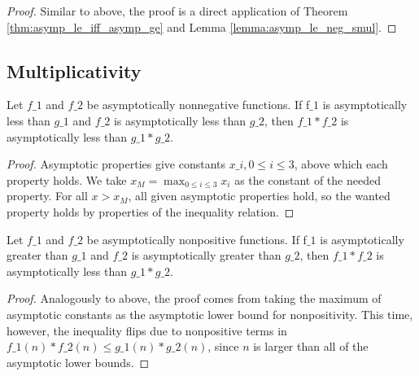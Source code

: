 \begin{proof}
    \leanok
    Similar to above, the proof is a direct application of Theorem \ref{thm:asymp_le_iff_asymp_ge}
    and Lemma \ref{lemma:asymp_le_neg_smul}.
\end{proof}


\subsection{Multiplicativity}

\begin{theorem}
    \label{thm:asymp_le_nonneg_mul}
    \leanok
    Let $f\_1$ and $f\_2$ be asymptotically nonnegative functions. If f$\_1$ is asymptotically
    less than $g\_1$ and $f\_2$ is asymptotically less than $g\_2$, then $f\_1 * f\_2$
    is asymptotically less than $g\_1 * g\_2$.
\end{theorem}

\begin{proof}
    \leanok
    Asymptotic properties give constants $x\_i, 0 \le i \le 3$, above which each property holds.
    We take $x_M = \max_{0 \le i \le 3} x_i$ as the constant of the needed property. 
    For all $x > x_M$, all given asymptotic properties hold, so the wanted property holds
    by properties of the inequality relation.
\end{proof}

\begin{theorem}
    \label{thm:asymp_ge_nonpos_mul}
    \leanok
    Let $f\_1$ and $f\_2$ be asymptotically nonpositive functions. If f$\_1$ is asymptotically
    greater than $g\_1$ and $f\_2$ is asymptotically greater than $g\_2$, then $f\_1 * f\_2$
    is asymptotically less than $g\_1 * g\_2$.
\end{theorem}

\begin{proof}
    \leanok
    Analogously to above, the proof comes from taking the maximum of asymptotic constants 
    as the asymptotic lower bound for nonpositivity. This time, however, the inequality
    flips due to nonpositive terms in $f\_1(n) * f\_2(n) \le g\_1(n) * g\_2(n)$, since 
    $n$ is larger than all of the asymptotic lower bounds.
\end{proof}


